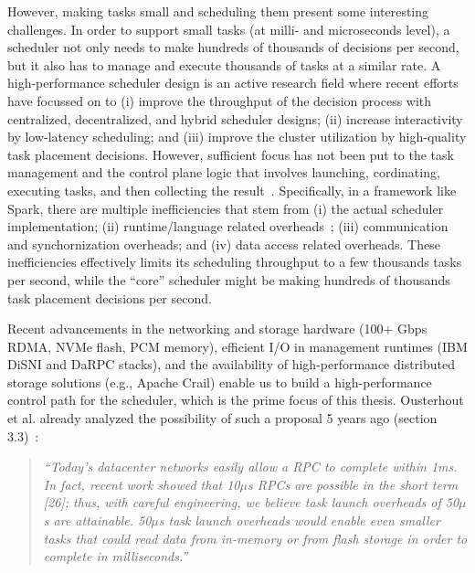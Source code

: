 \documentclass[10pt,a4paper]{article}
\begin{document}
However, making tasks small and scheduling them present some
interesting challenges.
In order to support small tasks (at milli- and microseconds level), a 
scheduler not only needs to make hundreds of thousands of 
decisions per second, but it also has to manage
and execute thousands of tasks at a similar rate. A high-performance
scheduler design is an active research field where recent
efforts~\cite{2015-sosp-sparrow,2015-eurosys-borg,2013-eurosys-omega,
2016-osdi-firm,2017-atc-lowlat}
have focussed on to (i) improve the throughput of the decision process with centralized, 
decentralized, and hybrid scheduler designs; (ii) increase interactivity by 
low-latency scheduling; and (iii) improve the cluster utilization by 
high-quality task placement decisions. 
However, sufficient focus has not been put to the task management and
the control plane logic that involves launching, cordinating, executing 
tasks, and then collecting the result~\cite{2017-atc-nimbus}. Specifically, 
in a framework like Spark, there are multiple inefficiencies that stem from 
(i) the actual scheduler implementation;  
(ii) runtime/language related overheads~\cite{2017-hotos-runtime}; 
(iii) communication and synchornization overheads; and  
(iv) data access related overheads. 
These inefficiencies effectively limits its scheduling throughput to a few 
thousands tasks per second, while the ``core'' scheduler might be making 
hundreds of thousands task placement decisions per second.     


Recent advancements in the networking and storage hardware (100+ Gbps
RDMA, NVMe flash, PCM memory), efficient I/O in management runtimes (IBM 
DiSNI and DaRPC stacks), and the availability of high-performance distributed
storage solutions (e.g., Apache Crail) enable us to build a high-performance
control path for the scheduler, which is the prime focus of this thesis.
Ousterhout et al. already analyzed the possibility of such a proposal 5 years 
ago (section 3.3)~\cite{2013-hotos-tiny-tasks}: 

\begin{quote}
\textit{``Today’s datacenter networks easily allow a RPC to complete within 
1ms. In fact, recent work showed that 10$\mu$s RPCs are possible in the short 
term [26]; thus, with careful engineering, we believe task launch overheads 
of 50$\mu$s are attainable. 50$\mu$s task launch overheads would enable even
smaller tasks that could read data from in-memory or from flash storage
in order to complete in milliseconds.''}
\end{quote}
\end{document}
